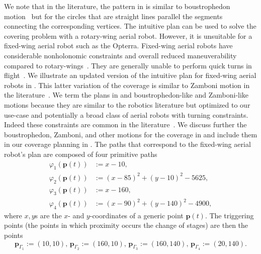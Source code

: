 We note that in the literature, the pattern in  is similar to boustrophedon motion~\citep{choset2005principles,lavalle2006planning,choset2001coverage} but for the circles that are straight lines parallel the segments connecting the corresponding vertices.
The intuitive plan can be used to solve the covering problem with a rotary-wing aerial robot. However, it is unsuitable for a fixed-wing aerial robot such as the Opterra. Fixed-wing aerial robots have considerable nonholonomic constraints and overall reduced maneuverability compared to rotary-wings~\citep{dille2013efficient,mannadiar2010optimal,xu2011optimal,xu2014efficient}. They are generally unable to perform quick turns in flight~\citep{wang2017curvature}. We illustrate an updated version of the intuitive plan for fixed-wing aerial robots in . This latter variation of the coverage is similar to Zamboni motion in the literature~\citep{araujo2013multiple}. 
We term the plans in  and  boustrophedon-like and Zamboni-like motions because they are similar to the robotics literature but optimized to our use-case and potentially a broad class of aerial robots with turning constraints. Indeed these constraints are common in the literature~\citep{huang2001optimal,artemenko2016energy,li2011coverage,xu2011optimal,xu2014efficient}. 
We discuss further the boustrophedon, Zamboni, and other motions for the coverage in  and include them in our coverage planning in . The paths that correspond to the fixed-wing aerial robot's plan are composed of four primitive paths
\begin{subequations}\label{eq:basic-plan}\begin{align}
\varphi_1(\mathbf{p}(t))&:=x-10,\label{eq:line1}\\
\varphi_2(\mathbf{p}(t))&:=(x-85)^2+(y-10)^2-5625,\label{eq:circ1}\\
\varphi_3(\mathbf{p}(t))&:=x-160,\label{eq:line2}\\
\varphi_4(\mathbf{p}(t))&:=(x-90)^2+(y-140)^2-4900,\label{eq:circ2}\end{align}
\end{subequations}
where $x,y$s are the $x$- and $y$-coordinates of a generic point $\mathbf{p}(t)$. The triggering points (the points in which proximity occurs the change of stages) are then the points
\begin{equation}\label{eq:basic-plan-trigs}
  \mathbf{p}_{\Gamma_1}:=(10,10),\,\mathbf{p}_{\Gamma_2}:=(160,10),\,\mathbf{p}_{\Gamma_3}:=(160,140),\,\mathbf{p}_{\Gamma_4}:=(20,140).
\end{equation}

